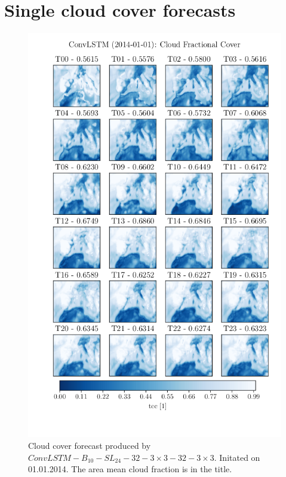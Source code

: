 \cleardoublepage
\section{Single cloud cover forecasts}
\begin{figure}
    \centering
    \includegraphics[scale =0.9]{python_figs/timelapse_convlstm_24hrs_from_2014-01-01.png}
    \caption{Cloud cover forecast produced by $ConvLSTM-B_{10}-SL_{24}-32-3\times3-32-3\times3$. Initated on 01.01.2014. The area mean  cloud fraction is in the title.}
    \label{fig:timelapse_3x3}
\end{figure}
